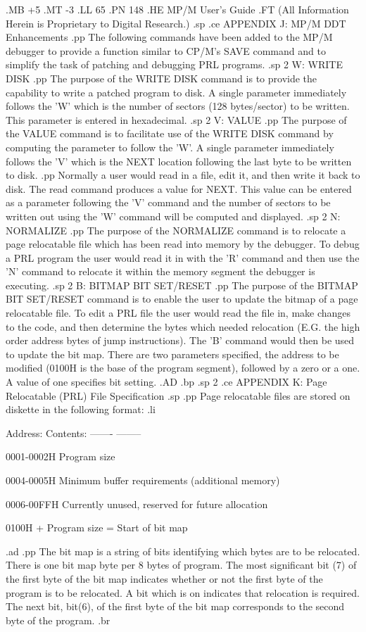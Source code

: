 .MB +5
.MT -3
.LL 65
.PN 148
.HE MP/M User's Guide
.FT   (All Information Herein is Proprietary to Digital Research.)
.sp
.ce
APPENDIX J:  MP/M DDT Enhancements
.pp
The  following commands have been added to the MP/M  debugger
to  provide  a  function  similar to CP/M's  SAVE  command  and  to
simplify the task of patching and debugging PRL programs.
.sp 2
W:  WRITE DISK
.pp
The  purpose  of  the WRITE DISK command is  to  provide  the
capability to write a patched program to disk.   A single parameter
immediately  follows  the 'W' which is the number of  sectors  (128
bytes/sector)  to be written.   This parameter is entered in  hexadecimal.
.sp 2
V:  VALUE
.pp
The purpose of the VALUE command is to facilitate use  of the
WRITE DISK command by computing the parameter to follow the 'W'.  A
single parameter immediately follows the 'V' which is the NEXT
location following the last byte to be written to disk.
.pp
Normally a user would read in a file, edit it, and then write
it back to disk.  The read command produces a value for NEXT.  This
value  can be entered as a parameter following the 'V' command  and
the number of sectors to be written out using the 'W' command  will
be computed and displayed.
.sp 2
N:  NORMALIZE
.pp
The  purpose  of the NORMALIZE command is to relocate a  page
relocatable  file which has been read into memory by the  debugger.
To  debug  a  PRL  program the user would read it in  with  the 'R'
command  and  then use  the 'N' command to relocate it  within  the
memory segment the debugger is executing.
.sp 2
B:  BITMAP BIT SET/RESET
.pp
The purpose of the BITMAP BIT SET/RESET command is to  enable
the user to update the bitmap of a page relocatable file.   To edit
a  PRL  file the user would read the file in,  make changes to  the
code,  and  then determine the bytes which needed relocation  (E.G.
the  high  order  address bytes of  jump  instructions).   The  'B'
command  would then be used to update the bit map.   There are  two
parameters specified, the address to be modified (0100H is the base
of the program segment),  followed by a zero or a one.   A value of
one specifies bit setting.
.AD
.bp
.sp 2
.ce
APPENDIX K:  Page Relocatable (PRL) File Specification
.sp
.pp
Page  relocatable  files  are  stored  on  diskette  in  the
following format:
.li

Address:    Contents:
-------     --------

0001-0002H  Program size

0004-0005H  Minimum buffer requirements (additional memory)

0006-00FFH  Currently unused, reserved for future allocation


0100H + Program size  =  Start of bit map

.ad
.pp
The  bit map is a string of bits identifying which bytes  are
to be relocated.  There is one bit map byte per 8 bytes of program.
The  most  significant  bit (7) of the first byte of  the  bit  map
indicates  whether  or not the first byte of the program is  to  be
relocated.  A bit which is on indicates that relocation is
required.  The next bit,  bit(6),  of the first byte of the bit map
corresponds to the second byte of the program.
.br
